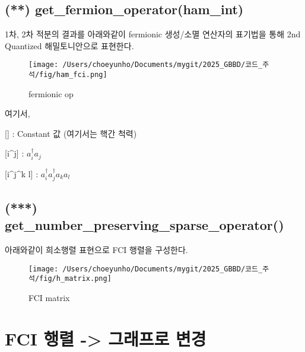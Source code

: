 \documentclass[11pt]{article}
\begin{document}
\subsection{(**) get\_fermion\_operator(ham\_int)}
1차, 2차 적분의 결과를 아래와같이 fermionic 생성/소멸 연산자의 표기법을 통해 2nd Quantized 해밀토니안으로 표현한다. 
\begin{figure}[H]
    \centering
    \texttt{[image: /Users/choeyunho/Documents/mygit/2025\_GBBD/코드\_주석/fig/ham\_fci.png]}
    \caption{fermionic op}
    \label{fig:my_image}
\end{figure}
여기서, 
\begin{center}
[] : Constant 값 (여기서는 핵간 척력) 

[i\textasciicircum  j] : $a^{\dagger}_i a_j $ 

[i\textasciicircum  j\textasciicircum k l] : $a^{\dagger}_i a^{\dagger}_j a_k a_l $ 
\end{center}

\newpage

\subsection{(***) get\_number\_preserving\_sparse\_operator()}
아래와같이 희소행렬 표현으로 FCI 행렬을 구성한다. 
\begin{figure}[H]
    \centering
    \texttt{[image: /Users/choeyunho/Documents/mygit/2025\_GBBD/코드\_주석/fig/h\_matrix.png]}
    \caption{FCI matrix}
    \label{fig:my_image}
\end{figure}

\newpage

\section{FCI 행렬 -> 그래프로 변경}
\end{document}
